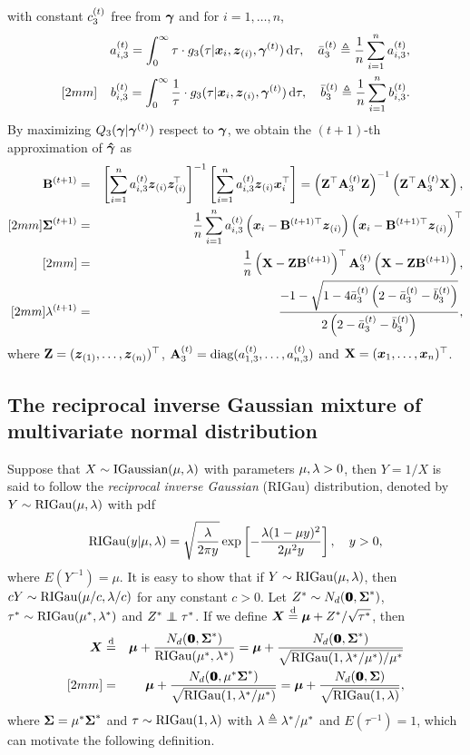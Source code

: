 with constant $c^{(t)}_{3}$ free from ${\boldsymbol{\gamma}}$ and for $i = 1, \dots, n$, 
\begin{eqnarray*}
    && a^{(t)}_{i,3} = \int_0^\infty \tau \cdot g_3(\tau | {\boldsymbol{x}}_i, {\boldsymbol{z}}_{(i)}, {\boldsymbol{\gamma}}^{(t)}) \,\mbox{d} \tau, \quad \bar{a}_{3}^{(t)} \triangleq \frac{1}{n} \sum_{i=1}^{n} a^{(t)}_{i,3}, \\ [2mm]
    && b^{(t)}_{i,3} = \int_0^\infty \frac{1}{\tau} \cdot g_3(\tau | {\boldsymbol{x}}_i, {\boldsymbol{z}}_{(i)}, {\boldsymbol{\gamma}}^{(t)}) \,\mbox{d} \tau, \quad \bar{b}_{3}^{(t)} \triangleq \frac{1}{n} \sum_{i=1}^{n} b^{(t)}_{i,3}.
\end{eqnarray*}
By maximizing $Q_3({\boldsymbol{\gamma}} | {\boldsymbol{\gamma}}^{(t)})$ respect to ${\boldsymbol{\gamma}}$, we obtain the $(t+1)$-th approximation of $\boldsymbol{\hat{\gamma}}$ as
\begin{eqnarray*}
    {\bf B}^{(t+1)} &=& \left[ \sum_{i=1}^n a^{(t)}_{i,3} {\boldsymbol{z}}_{(i)} {\boldsymbol{z}}_{(i)}^{\!\top\!} \right]^{-1} \left[ \sum_{i=1}^n a^{(t)}_{i,3} {\boldsymbol{z}}_{(i)} {\boldsymbol{x}}_i^\top \right] = \left({\bf Z}^\top {\bf A}_{3}^{(t)} {\bf Z}\right)^{-1} \left({\bf Z}^\top {\bf A}_{3}^{(t)} {\bf X}\right), \\ [2mm]
    {\mbox{\boldmath$\Sigma$}}^{(t+1)} &=& \frac{1}{n} \sum_{i=1}^n a^{(t)}_{i,3} \left( {\boldsymbol{x}}_i - {\bf B}^{(t+1)\top} {\boldsymbol{z}}_{(i)}\right) \left( {\boldsymbol{x}}_i - {\bf B}^{(t+1)\top}{\boldsymbol{z}}_{(i)} \right)^\top \\ [2mm]
    &=& \frac{1}{n}\left({\bf X} - {\bf Z} {\bf B}^{(t+1)} \right)^\top {\bf A}_{3}^{(t)} \left({\bf X} - {\bf Z} {\bf B}^{(t+1)} \right), \\ [2mm]
    \lambda^{(t+1)} &=& \frac{-1 - \sqrt{1 - 4\bar{a}_{3}^{(t)}\left(2 - \bar{a}_{3}^{(t)} - \bar{b}_{3}^{(t)}\right)}}{2\left(2 - \bar{a}_{3}^{(t)} - \bar{b}_{3}^{(t)}\right)},
\end{eqnarray*}
where ${\bf Z} = ({\boldsymbol{z}}_{(1)}, \dots, {\boldsymbol{z}}_{(n)})^\top$, ${\bf A}_{3}^{(t)} = \mbox{diag}(a^{(t)}_{1,3}, \dots, a^{(t)}_{n,3})$ and ${\bf X} = ({\boldsymbol{x}}_1, \dots, {\boldsymbol{x}}_n)^\top$.

\subsection{The reciprocal inverse Gaussian mixture of multivariate normal distribution}       %

Suppose that $X \sim \mbox{IGaussian}(\mu, \lambda)$ with parameters $\mu, \lambda > 0$, then $Y = 1 / X$ is said to follow the \textit{reciprocal inverse Gaussian} (RIGau) distribution, denoted by $Y \sim \mbox{RIGau}(\mu, \lambda)$ with pdf
$$
    \mbox{RIGau}(y|\mu, \lambda) = \sqrt{\frac{\lambda}{2\pi y}} \exp\left[ -\frac{\lambda(1 - \mu y)^2}{2\mu^2 y} \right], \quad y > 0,
$$
where $E(Y^{-1}) = \mu$. It is easy to show that if $Y \sim \mbox{RIGau}(\mu, \lambda)$, then $cY \sim \mbox{RIGau}(\mu / c, \lambda / c)$ for any constant $c > 0$. Let $Z^* \sim N_d({\bf 0}\!\!\!{\bf 0}, {\mbox{\boldmath$\Sigma$}}^*)$, $\tau^* \sim \mbox{RIGau}(\mu^*, \lambda^*)$ and $Z^* \inde \tau^*$. If we define ${\boldsymbol{X}} \stackrel{{\rm d}}{=} {\boldsymbol{\mu}} + Z^* / \sqrt{\tau^*}$, then
\begin{eqnarray*}
    \ibX &\sd& \bmu + \frac{N_d(\0, \bSi^*)}{\RIGau(\mu^*, \la^*)} = \bmu + \frac{N_d(\0, \bSi^*)}{\sqrt{\RIGau(1, \la^* / \mu^*) / \mu^*}} \\ [2mm]
    &=& \bmu + \frac{N_d(\0, \mu^* \bSi^*)}{\sqrt{\RIGau(1, \la^* / \mu^*)}} = \bmu + \frac{N_d(\0, \bSi)}{\sqrt{\RIGau(1, \la)}},
\end{eqnarray*}
where ${\mbox{\boldmath$\Sigma$}} = \mu^* {\mbox{\boldmath$\Sigma$}}^*$ and $\tau \sim \mbox{RIGau}(1, \lambda)$ with $\lambda \triangleq \lambda^* / \mu^*$ and $E(\tau^{-1}) = 1$, which can motivate the following definition.

